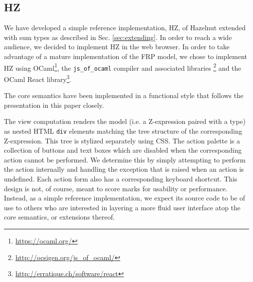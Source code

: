 \subsection{HZ}
We have developed a simple reference implementation, HZ, of Hazelnut extended with sum types as described in Sec. \ref{sec:extending}.  In
order to reach a wide audience, we decided to implement HZ in the web
browser.  In order to take advantage of a mature implementation of the FRP
model, we chose to implement HZ using
OCaml\footnote{\url{https://ocaml.org/}}, the \texttt{js\_of\_ocaml}
compiler and associated libraries
\cite{DBLP:conf/ml/Balat06}\footnote{\url{http://ocsigen.org/js\_of\_ocaml/}}
and the OCaml React
library\footnote{\url{http://erratique.ch/software/react}}.

The core semantics have
been implemented in a functional style that follows the presentation in this paper closely.

The view computation renders the model (i.e. a Z-expression paired with a type) as nested HTML \texttt{div} elements matching the tree structure of the corresponding Z-expression. This tree is stylized separately using CSS. The action palette is a collection of buttons and text boxes which
are disabled when the corresponding action cannot be performed. We determine this by simply attempting to perform the
action internally and handling the exception that is raised when an action
is undefined. Each action form also has a corresponding keyboard shortcut. This design is not, of course, meant to score marks for
usability or performance. Instead, as a simple reference implementation, we
expect its source code to be of use to others who are interested in
layering a more fluid user interface atop the core semantics, or extensions thereof. 
